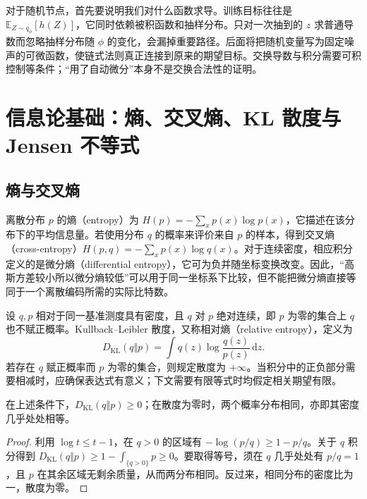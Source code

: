 \documentclass[UTF8,12pt,a4paper,fontset=fandol]{ctexart}
\begin{document}
对于随机节点，首先要说明我们对什么函数求导。训练目标往往是 $\mathbb E_{Z\sim q_\phi}[h(Z)]$，它同时依赖被积函数和抽样分布。只对一次抽到的 $z$ 求普通导数而忽略抽样分布随 $\phi$ 的变化，会漏掉重要路径。后面将把随机变量写为固定噪声的可微函数，使链式法则真正连接到原来的期望目标。交换导数与积分需要可积控制等条件；“用了自动微分”本身不是交换合法性的证明。

\section{信息论基础：熵、交叉熵、KL 散度与 Jensen 不等式}
\label{sec:vae-information}

\subsection{熵与交叉熵}
离散分布 $p$ 的熵（entropy）为 $H(p)=-\sum_xp(x)\log p(x)$，它描述在该分布下的平均信息量。若使用分布 $q$ 的概率来评价来自 $p$ 的样本，得到交叉熵（cross-entropy）$H(p,q)=-\sum_xp(x)\log q(x)$。对于连续密度，相应积分定义的是微分熵（differential entropy），它可为负并随坐标变换改变。因此，“高斯方差较小所以微分熵较低”可以用于同一坐标系下比较，但不能把微分熵直接等同于一个离散编码所需的实际比特数。

\begin{definition}[相对熵]
设 $q,p$ 相对于同一基准测度具有密度，且 $q$ 对 $p$ 绝对连续，即 $p$ 为零的集合上 $q$ 也不赋正概率。Kullback--Leibler 散度，又称相对熵（relative entropy），定义为
\begin{equation}
 D_{\mathrm{KL}}(q\Vert p)=\int q(z)\log\frac{q(z)}{p(z)}\,\mathrm dz.
 \label{eq:vae-kl-definition}
\end{equation}
若存在 $q$ 赋正概率而 $p$ 为零的集合，则规定散度为 $+\infty$。当积分中的正负部分需要相减时，应确保表达式有意义；下文需要有限等式时均假定相关期望有限。
\end{definition}

\begin{proposition}[非负性及等号条件]
在上述条件下，$D_{\mathrm{KL}}(q\Vert p)\geq0$；在散度为零时，两个概率分布相同，亦即其密度几乎处处相等。
\end{proposition}
\begin{proof}
利用 $\log t\leq t-1$，在 $q>0$ 的区域有 $-\log(p/q)\geq1-p/q$。关于 $q$ 积分得到 $D_{\mathrm{KL}}(q\Vert p)\geq1-\int_{\{q>0\}}p\geq0$。要取得等号，须在 $q$ 几乎处处有 $p/q=1$，且 $p$ 在其余区域无剩余质量，从而两分布相同。反过来，相同分布的密度比为一，散度为零。
\end{proof}
\end{document}
